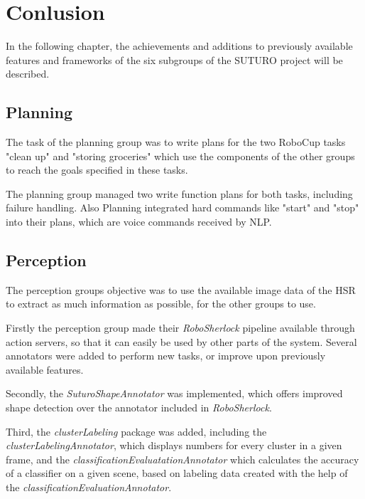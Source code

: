 \documentclass[main.tex]{subfiles}
\begin{document}
	\begingroup

	\renewcommand{\cleardoublepage}{}

	\renewcommand{\clearpage}{}

	\chapter{Conlusion}
		In the following chapter, the achievements and additions to previously available features and frameworks of the six subgroups of the SUTURO project will be described.
		
		\section{Planning}
		The task of the planning group was to write plans for the two RoboCup tasks "clean up" and "storing groceries" which use the components of the other groups to reach the goals specified in these tasks.
		
		The planning group managed two write function plans for both tasks, including failure handling. Also Planning integrated hard commands like "start" and "stop" into their plans, which are voice commands received by NLP.
		
		\section{Perception}
		The perception groups objective was to use the available image data of the HSR to extract as much information as possible, for the other groups to use.
				
		Firstly the perception group made their \textit{RoboSherlock} pipeline available through action servers, so that it can easily be used by other parts of the system. Several annotators were added to perform new tasks, or improve upon previously available features. 
		
		Secondly, the \textit{SuturoShapeAnnotator} was implemented, which offers improved shape detection over the annotator included in \textit{RoboSherlock}. 
		
		Third, the \textit{clusterLabeling} package was added, including the \textit{clusterLabelingAnnotator}, which displays numbers for every cluster in a given frame, and the \textit{classificationEvaluatationAnnotator} which calculates the accuracy of a classifier on a given scene, based on labeling data created with the help of the \textit{classificationEvaluationAnnotator}. 
		
\end{document}
